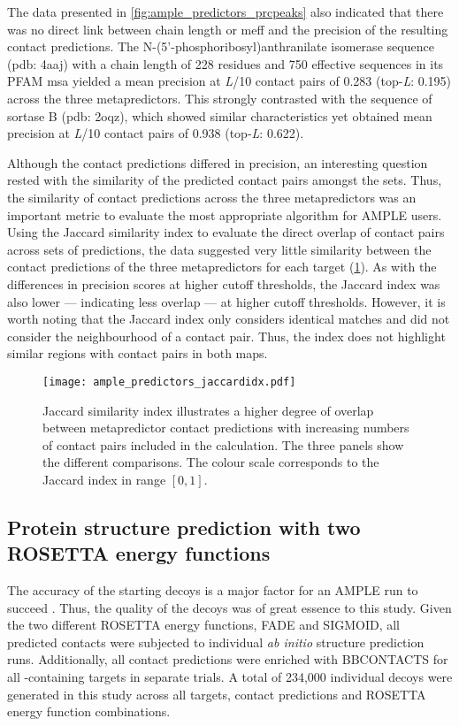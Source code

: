 The data presented in \cref{fig:ample_predictors_prcpeaks} also indicated that there was no direct link between chain length or \gls{meff} and the precision of the resulting contact predictions. The N-(5'-phosphoribosyl)anthranilate isomerase sequence (\gls{pdb}: 4aaj) with a chain length of 228 residues and 750 effective sequences in its PFAM \gls{msa} yielded a mean precision at \textit{L}/10 contact pairs of 0.283 (top-\textit{L}: 0.195) across the three metapredictors. This strongly contrasted with the sequence of sortase B (\gls{pdb}: 2oqz), which showed similar characteristics yet obtained  mean precision at \textit{L}/10 contact pairs of 0.938 (top-\textit{L}: 0.622).

Although the contact predictions differed in precision, an interesting question rested with the similarity of the predicted contact pairs amongst the sets. Thus, the similarity of contact predictions across the three metapredictors was an important metric to evaluate the most appropriate algorithm for AMPLE users. Using the Jaccard similarity index to evaluate the direct overlap of contact pairs across sets of predictions, the data suggested very little similarity between the contact predictions of the three metapredictors for each target (\cref{fig:ample_predictors_jaccardidx}). As with the differences in precision scores at higher cutoff thresholds, the Jaccard index was also lower --- indicating less overlap --- at higher cutoff thresholds. However, it is worth noting that the Jaccard index only considers identical matches and did not consider the neighbourhood of a contact pair. Thus, the index does not highlight similar regions with contact pairs in both maps.

\begin{figure}[H]
    \centering
    \texttt{[image: ample\_predictors\_jaccardidx.pdf]}
    \caption[Metapredictor contact pair similarity analysis]{Jaccard similarity index illustrates a higher degree of overlap between metapredictor contact predictions with increasing numbers of contact pairs included in the calculation. The three panels show the different comparisons. The colour scale corresponds to the Jaccard index in range $[0, 1]$.}
    \label{fig:ample_predictors_jaccardidx}
\end{figure}

\subsection{Protein structure prediction with two ROSETTA energy functions} \label{sec:ample_predictors_efunc_comp}
The accuracy of the starting decoys is a major factor for an AMPLE run to succeed \cite{Thomas2017-sh}. Thus, the quality of the decoys was of great essence to this study. Given the two different ROSETTA energy functions, FADE and SIGMOID, all predicted contacts were subjected to individual \textit{ab initio} structure prediction runs. Additionally, all contact predictions were enriched with BBCONTACTS for all \textbeta-containing targets in separate trials. A total of 234,000 individual decoys were generated in this study across all targets, contact predictions and ROSETTA energy function combinations.

